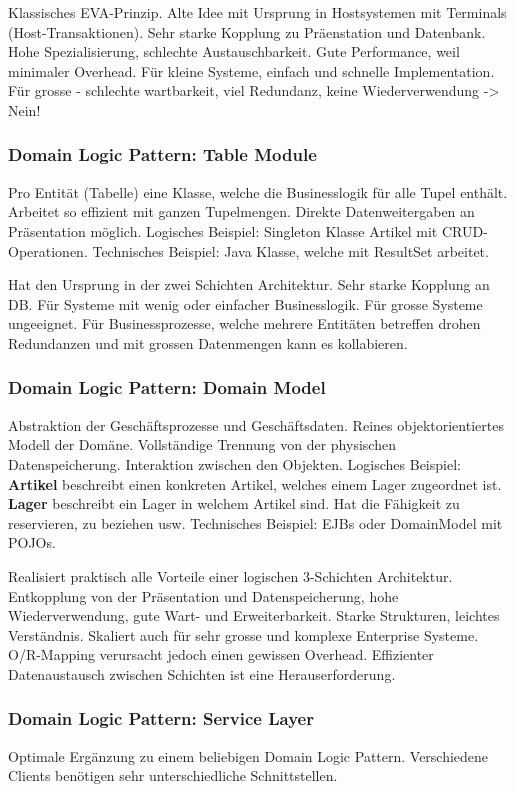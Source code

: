 Klassisches EVA-Prinzip. Alte Idee mit Ursprung in Hostsystemen mit Terminals (Host-Transaktionen). Sehr starke Kopplung zu Präenstation und Datenbank. Hohe Spezialisierung, schlechte Austauschbarkeit. Gute Performance, weil minimaler Overhead. Für kleine Systeme, einfach und schnelle Implementation. Für grosse - schlechte wartbarkeit, viel Redundanz, keine Wiederverwendung -> Nein!

\subsubsection{Domain Logic Pattern: Table Module}
Pro Entität (Tabelle) eine Klasse, welche die Businesslogik für alle Tupel enthält. Arbeitet so effizient mit ganzen Tupelmengen. Direkte Datenweitergaben an Präsentation möglich. Logisches Beispiel: Singleton Klasse Artikel mit CRUD-Operationen. Technisches Beispiel: Java Klasse, welche mit ResultSet arbeitet.

Hat den Ursprung in der zwei Schichten Architektur. Sehr starke Kopplung an DB. Für Systeme mit wenig oder einfacher Businesslogik. Für grosse Systeme ungeeignet. Für Businessprozesse, welche mehrere Entitäten betreffen drohen Redundanzen und mit grossen Datenmengen kann es kollabieren.

\subsubsection{Domain Logic Pattern: Domain Model}
Abstraktion der Geschäftsprozesse und Geschäftsdaten. Reines objektorientiertes Modell der Domäne. Vollständige Trennung von der physischen Datenspeicherung. Interaktion zwischen den Objekten. Logisches Beispiel: \textbf{Artikel} beschreibt einen konkreten Artikel, welches einem Lager zugeordnet ist. \textbf{Lager} beschreibt ein Lager in welchem Artikel sind. Hat die Fähigkeit zu reservieren, zu beziehen usw.
Technisches Beispiel: EJBs oder DomainModel mit POJOs.

Realisiert praktisch alle Vorteile einer logischen 3-Schichten Architektur. Entkopplung von der Präsentation und Datenspeicherung, hohe Wiederverwendung, gute Wart- und Erweiterbarkeit. Starke Strukturen, leichtes Verständnis. Skaliert auch für sehr grosse und komplexe Enterprise Systeme.
O/R-Mapping verursacht jedoch einen gewissen Overhead. Effizienter Datenaustausch zwischen Schichten ist eine Herauserforderung.

\subsubsection{Domain Logic Pattern: Service Layer}
Optimale Ergänzung zu einem beliebigen Domain Logic Pattern. Verschiedene Clients benötigen sehr unterschiedliche Schnittstellen.

